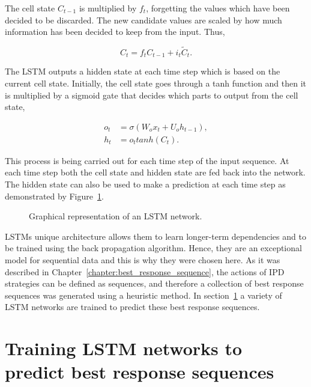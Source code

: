 The cell state \(C_{t-1}\) is multiplied by \(f_{t}\), forgetting the values
which have been decided to be discarded. The new candidate values are scaled by how
much information has been decided to keep from the input. Thus,

\begin{equation}\label{eq:cell_gate}
    C_{t} = f_{t} C_{t-1} + i_{t} \tilde{C}_{t}.
\end{equation}

The LSTM outputs a hidden state at each time step which is based on the current
cell state. Initially, the cell state goes through a tanh function and then it
is multiplied by a sigmoid gate that decides which parts to output from the cell
state,

\begin{align}\label{eq:outpu_gate}
    o_{t} & = \sigma(W_{o}x_{t} + U_{o}h_{t-1}), \\
    h_{t} & = o_{t} tanh(C_{t}).
\end{align}

This process is being carried out for each time step of the input sequence. At
each time step both the cell state and hidden state are fed back into the
network. The hidden state can also be used to make a prediction at each time
step as demonstrated by Figure~\ref{fig:lstm}.

\vspace{1cm}
\begin{figure}[!htbp]
    \centering
    
    \caption{Graphical representation of an LSTM network.}\label{fig:lstm}
\end{figure}

\newpage

LSTMs unique architecture allows them to learn longer-term dependencies and to
be trained using the back propagation algorithm. Hence, they are an exceptional
model for sequential data and this is why they were chosen here. As it was described in
Chapter~\ref{chapter:best_response_sequence}, the actions of IPD strategies can
be defined as sequences, and therefore a collection of best response sequences was
generated using a heuristic method. In section~\ref{section:training_a_rnn} a
variety of LSTM networks are trained to predict these best response sequences.

\section{Training LSTM networks to predict best response sequences}\label{section:training_a_rnn}

